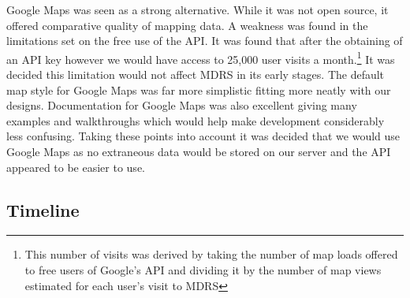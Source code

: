 \documentclass{l3proj}
\begin{document}
Google Maps\cite{googleMaps} was seen as a strong alternative. While it was not open source, it offered comparative quality of mapping data. A weakness was found in the limitations set on the free use of the \gls{API}. It was found that after the obtaining of an API key however we would have access to 25,000 user visits a month.\footnote{This number of visits was derived by taking the number of map loads offered to free users of Google's API and dividing it by the number of map views estimated for each user's visit to MDRS} It was decided this limitation would not affect MDRS in its early stages. The default map style for Google Maps was far more simplistic fitting more neatly with our designs. Documentation for Google Maps was also excellent giving many examples and walkthroughs which would help make development considerably less confusing. Taking these points into account it was decided that we would use Google Maps as no extraneous data would be stored on our server and the API appeared to be easier to use.

\subsection{Timeline}



\end{document}
